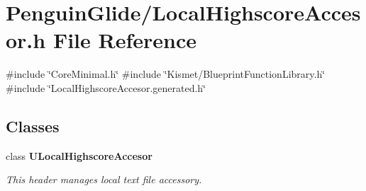 \section{Penguin\+Glide/\+Local\+Highscore\+Accesor.h File Reference}
\label{_local_highscore_accesor_8h}
{\ttfamily \#include \char`\"{}Core\+Minimal.\+h\char`\"{}}\newline
{\ttfamily \#include \char`\"{}Kismet/\+Blueprint\+Function\+Library.\+h\char`\"{}}\newline
{\ttfamily \#include \char`\"{}Local\+Highscore\+Accesor.\+generated.\+h\char`\"{}}\newline
\subsection*{Classes}
\begin{DoxyCompactItemize}
\item 
class \textbf{ U\+Local\+Highscore\+Accesor}
\begin{DoxyCompactList}\small\item\em This header manages local text file accessory. \end{DoxyCompactList}\end{DoxyCompactItemize}
